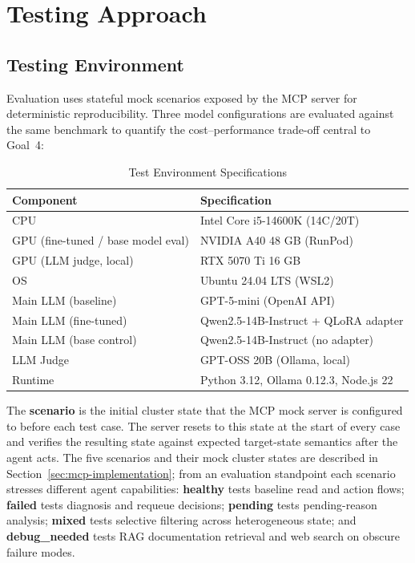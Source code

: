 \section{Testing Approach}
\label{sec:testing-approach}

\subsection{Testing Environment}

Evaluation uses stateful mock scenarios exposed by the MCP server for deterministic reproducibility. Three model configurations are evaluated against the same benchmark to quantify the cost--performance trade-off central to Goal~4:

\begin{table}[H]
    \centering
    \caption{Test Environment Specifications}
    \label{tab:test-specs}
    \small
    \begin{tabular}{|l|l|}
        \hline
        \textbf{Component} & \textbf{Specification} \\
        \hline
        CPU & Intel Core i5-14600K (14C/20T) \\
        GPU (fine-tuned / base model eval) & NVIDIA A40 48 GB (RunPod) \\
        GPU (LLM judge, local) & RTX 5070 Ti 16 GB \\
        OS & Ubuntu 24.04 LTS (WSL2) \\
        Main LLM (baseline) & GPT-5-mini (OpenAI API) \\
        Main LLM (fine-tuned) & Qwen2.5-14B-Instruct + QLoRA adapter \\
        Main LLM (base control) & Qwen2.5-14B-Instruct (no adapter) \\
        LLM Judge & GPT-OSS 20B (Ollama, local) \\
        Runtime & Python 3.12, Ollama 0.12.3, Node.js 22 \\
        \hline
    \end{tabular}
\end{table}

The \textbf{scenario} is the initial cluster state that the MCP mock server is configured to before each test case. The server resets to this state at the start of every case and verifies the resulting state against expected target-state semantics after the agent acts. The five scenarios and their mock cluster states are described in Section~\ref{sec:mcp-implementation}; from an evaluation standpoint each scenario stresses different agent capabilities: \textbf{healthy} tests baseline read and action flows; \textbf{failed} tests diagnosis and requeue decisions; \textbf{pending} tests pending-reason analysis; \textbf{mixed} tests selective filtering across heterogeneous state; and \textbf{debug\_needed} tests RAG documentation retrieval and web search on obscure failure modes.

